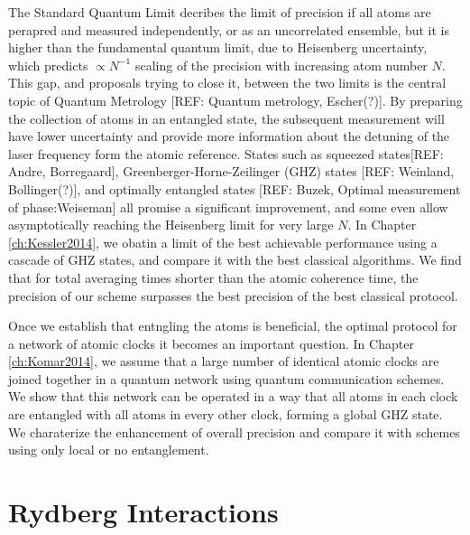 The Standard Quantum Limit decribes the limit of precision if all atoms are
perapred and measured independently, or as an uncorrelated ensemble, but it is
higher than the fundamental quantum limit, due to Heisenberg uncertainty, which
predicts $\propto N^{-1}$ scaling of the precision with increasing atom number
$N$. This gap, and proposals trying to close it, between the two limits is the
central topic of Quantum Metrology [REF: Quantum metrology, Escher(?)]. By
preparing the collection of atoms in an entangled state, the subsequent
measurement will have lower uncertainty and provide more information about the
detuning of the laser frequency form the atomic reference. States such as
squeezed states[REF: Andre, Borregaard], Greenberger-Horne-Zeilinger (GHZ)
states [REF: Weinland, Bollinger(?)], and optimally entangled states [REF: Buzek,
Optimal measurement of phase:Weiseman] all promise a significant improvement,
and some even allow asymptotically reaching the Heisenberg limit for very large
$N$. In Chapter \ref{ch:Kessler2014}, we obatin a limit of the best achievable
performance using a cascade of GHZ states, and compare it with the best
classical algorithms. We find that for total averaging times shorter than the
atomic coherence time, the precision of our scheme surpasses the best
precision of the best classical protocol.

Once we establish that entngling the atoms is beneficial, the optimal
protocol for a network of atomic clocks it becomes an important question. In
Chapter \ref{ch:Komar2014}, we assume that a large number of identical atomic
clocks are joined together in a quantum network using quantum communication
schemes. We show that this network can be operated in a way that all atoms in
each clock are entangled with all atoms in every other clock, forming a global
GHZ state. We charaterize the enhancement of overall precision and compare it
with schemes using only local or no entanglement.








\section{Rydberg Interactions}




